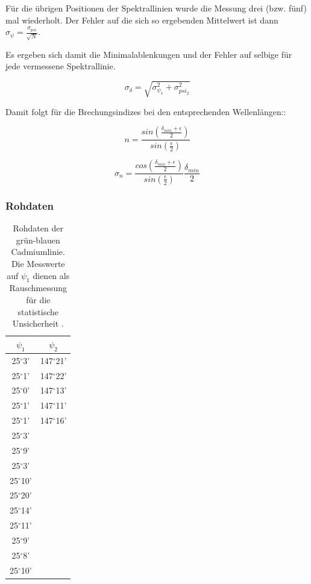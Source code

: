 \documentclass[12pt,a4paper]{article}
\begin{document}
Für die übrigen Positionen der Spektrallinien wurde die Messung drei (bzw. fünf) mal wiederholt. Der Fehler auf die sich so ergebenden Mittelwert ist dann $\sigma_{\psi}=\frac{\sigma_{psi}}{\sqrt{N}}$.

Es ergeben sich damit die Minimalablenkungen und der Fehler auf selbige für jede vermessene Spektrallinie.

\begin{equation}
\sigma_{\delta} = \sqrt{\sigma_{\psi_1}^2+\sigma_{psi_2}^2}
\end{equation}

Damit folgt für die Brechungsindizes bei den entsprechenden Wellenlängen::

\begin{equation}
n = \frac{sin(\frac{\delta_{min}+\epsilon}{2})}{sin(\frac{\epsilon}{2})}
\end{equation}

\begin{equation}
\sigma_n = \frac{cos(\frac{\delta_{min}+\epsilon}{2})}{sin(\frac{\epsilon}{2})} \frac{\delta_{min}}{2}
\end{equation}

\subsubsection{Rohdaten}

\begin{table}
\begin{center}
\begin{tabular}{|c|c|}
\hline 
$\psi_1$ & $\psi_2$ \\ 
\hline 
25$^{\circ}$3' & 147$^{\circ}$21' \\ 
\hline 
25$^{\circ}$1' & 147$^{\circ}$22' \\ 
\hline 
25$^{\circ}$0'& 147$^{\circ}$13' \\ 
\hline 
25$^{\circ}$1' & 147$^{\circ}$11' \\ 
\hline 
25$^{\circ}$1' & 147$^{\circ}$16' \\ 
\hline 
25$^{\circ}$3' & \\ 
\hline 
25$^{\circ}$9' & \\ 
\hline 
25$^{\circ}$3' & \\ 
\hline 
25$^{\circ}$10' & \\ 
\hline 
25$^{\circ}$20' & \\ 
\hline 
25$^{\circ}$14' & \\ 
\hline 
25$^{\circ}$11' & \\ 
\hline 
25$^{\circ}$9' & \\ 
\hline 
25$^{\circ}$8' & \\ 
\hline 
25$^{\circ}$10' & \\ 
\hline 

\end{tabular} 

\caption{Rohdaten der grün-blauen Cadmiumlinie. Die Messwerte auf $\psi_1$ dienen als Rauschmessung für die statistische Unsicherheit .}
\label{tab:RauschenPrisma}
\end{center}
\end{table}
\end{document}
